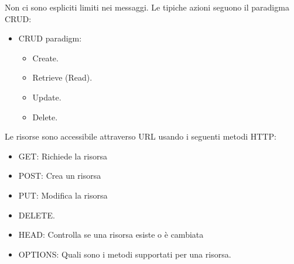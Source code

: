 \documentclass{article}
\begin{document}
		Non ci sono espliciti limiti nei messaggi. Le tipiche azioni seguono il paradigma CRUD:
		\begin{itemize}
		    \item CRUD paradigm: 
		    \begin{itemize}
		        \item Create.
		        \item Retrieve (Read).
		        \item Update.
		        \item Delete.
		    \end{itemize}
		\end{itemize}
		
		Le risorse sono accessibile attraverso URL usando i seguenti metodi HTTP:
		\begin{itemize}
		    \item GET: Richiede la risorsa
		    \item POST: Crea un risorsa
		    \item PUT: Modifica la risorsa
		    \item DELETE.
		    \item HEAD: Controlla se una risorsa esiste o è cambiata
		    \item OPTIONS: Quali sono i metodi supportati per una risorsa. 
		\end{itemize}
		
\end{document}

